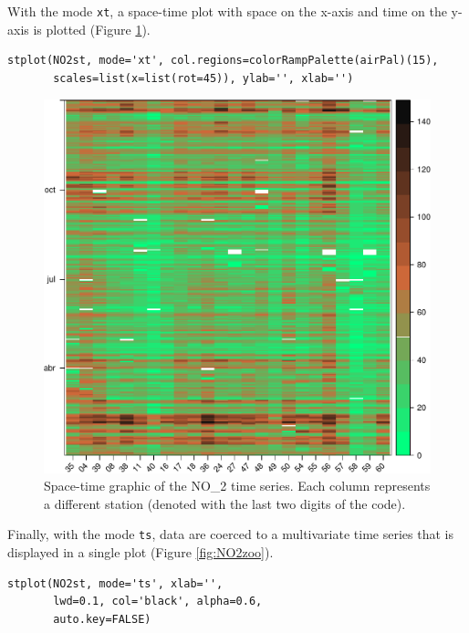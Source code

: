 \documentclass[smallroyalvopaper]{memoir}
\begin{document}
With the mode \texttt{xt}, a space-time plot with space on the x-axis and
time on the y-axis is plotted (Figure \ref{fig:NO2hovmoller}).

\lstset{language=R,numbers=none}
\begin{lstlisting}
stplot(NO2st, mode='xt', col.regions=colorRampPalette(airPal)(15),
       scales=list(x=list(rot=45)), ylab='', xlab='')
\end{lstlisting}

\begin{figure}[htb]
\centering
\includegraphics[width=.9\linewidth]{figs/NO2hovmoller.pdf}
\caption{\label{fig:NO2hovmoller}Space-time graphic of the NO\_2 time series. Each column represents a different station (denoted with the last two digits of the code).}
\end{figure}

Finally, with the mode \texttt{ts}, data are coerced to a multivariate time series
that is displayed in a single plot (Figure \ref{fig:NO2zoo}).

\lstset{language=R,numbers=none}
\begin{lstlisting}
stplot(NO2st, mode='ts', xlab='',
       lwd=0.1, col='black', alpha=0.6,
       auto.key=FALSE)
\end{lstlisting}
\end{document}
